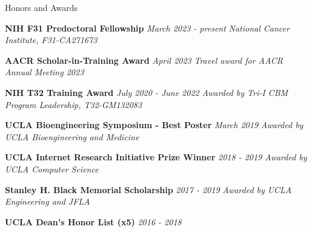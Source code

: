 \documentclass{resume} %
\begin{document}

\begin{rSection}{Honors and Awards}


\item \textbf{NIH F31 Predoctoral Fellowship} \hfill {\em March 2023 - present}
\newline
\textit{National Cancer Institute, F31-CA271673}

\item \textbf{AACR Scholar-in-Training Award} \hfill {\em April 2023}
\newline
\textit{Travel award for AACR Annual Meeting 2023}

\item \textbf{NIH T32 Training Award} \hfill {\em July 2020 - June 2022}
\newline
\textit{Awarded by Tri-I CBM Program Leadership, T32-GM132083}

\item \textbf{UCLA Bioengineering Symposium - Best Poster} \hfill {\em March 2019}
\newline
\textit{Awarded by UCLA Bioengineering and Medicine}

\item \textbf{UCLA Internet Research Initiative Prize Winner} \hfill {\em 2018 - 2019}
\newline
\textit{Awarded by UCLA Computer Science}

\item \textbf{Stanley H. Black Memorial Scholarship} \hfill {\em 2017 - 2019}
\newline
\textit{Awarded by UCLA Engineering and JFLA}

\item \textbf{UCLA Dean’s Honor List (x5)} \hfill {\em 2016 - 2018}

\end{rSection}


\end{document}
